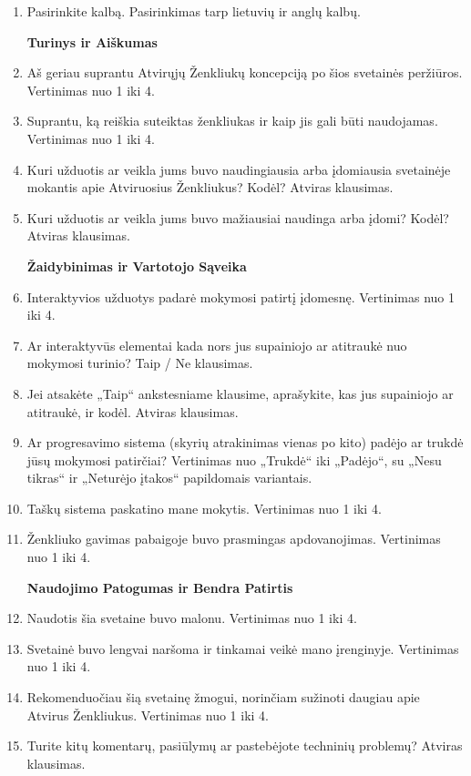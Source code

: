 \begin{enumerate}
\item Pasirinkite kalbą. Pasirinkimas tarp lietuvių ir anglų kalbų.

\textbf{Turinys ir Aiškumas}
\item Aš geriau suprantu Atvirųjų Ženkliukų koncepciją po šios svetainės peržiūros. Vertinimas nuo 1 iki 4.
\item Suprantu, ką reiškia suteiktas ženkliukas ir kaip jis gali būti naudojamas. Vertinimas nuo 1 iki 4.
\item Kuri užduotis ar veikla jums buvo naudingiausia arba įdomiausia svetainėje mokantis apie Atviruosius Ženkliukus? Kodėl? Atviras klausimas.
\item Kuri užduotis ar veikla jums buvo mažiausiai naudinga arba įdomi? Kodėl? Atviras klausimas.

\textbf{Žaidybinimas ir Vartotojo Sąveika}
\item Interaktyvios užduotys padarė mokymosi patirtį įdomesnę. Vertinimas nuo 1 iki 4.
\item Ar interaktyvūs elementai kada nors jus supainiojo ar atitraukė nuo mokymosi turinio? Taip / Ne klausimas.
\item Jei atsakėte „Taip“ ankstesniame klausime, aprašykite, kas jus supainiojo ar atitraukė, ir kodėl. Atviras klausimas.
\item Ar progresavimo sistema (skyrių atrakinimas vienas po kito) padėjo ar trukdė jūsų mokymosi patirčiai? Vertinimas nuo „Trukdė“ iki „Padėjo“, su „Nesu tikras“ ir „Neturėjo įtakos“ papildomais variantais.
\item Taškų sistema paskatino mane mokytis. Vertinimas nuo 1 iki 4.
\item Ženkliuko gavimas pabaigoje buvo prasmingas apdovanojimas. Vertinimas nuo 1 iki 4.

\textbf{Naudojimo Patogumas ir Bendra Patirtis}
\item Naudotis šia svetaine buvo malonu. Vertinimas nuo 1 iki 4.
\item Svetainė buvo lengvai naršoma ir tinkamai veikė mano įrenginyje. Vertinimas nuo 1 iki 4.
\item Rekomenduočiau šią svetainę žmogui, norinčiam sužinoti daugiau apie Atvirus Ženkliukus. Vertinimas nuo 1 iki 4.
\item Turite kitų komentarų, pasiūlymų ar pastebėjote techninių problemų? Atviras klausimas.
\end{enumerate}

\newpage
{}
\label{appendix:external_resources}

